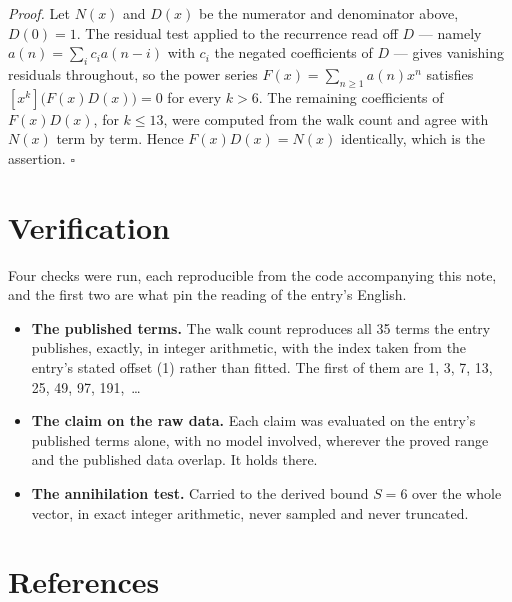 \documentclass[11pt]{article}
\theoremstyle{definition}
\begin{document}
{\itshape Proof.} Let $N(x)$ and $D(x)$ be the numerator and denominator above, $D(0)=1$. The residual test applied to the recurrence read off $D$ --- namely $a(n) = \sum_i c_i a(n-i)$ with $c_i$ the negated coefficients of $D$ --- gives vanishing residuals throughout, so the power series $F(x)=\sum_{n\ge 1}a(n)x^n$ satisfies $[x^k]\bigl(F(x)D(x)\bigr) = 0$ for every $k > 6$. The remaining coefficients of $F(x)D(x)$, for $k \le 13$, were computed from the walk count and agree with $N(x)$ term by term. Hence $F(x)D(x) = N(x)$ identically, which is the assertion. $\square$

\section{Verification}

Four checks were run, each reproducible from the code accompanying this note, and the first two are what pin the reading of the entry's English.

\begin{itemize}

\item {\bfseries The published terms.} The walk count reproduces all 35 terms the entry publishes, exactly, in integer arithmetic, with the index taken from the entry's stated offset (1) rather than fitted. The first of them are 1, 3, 7, 13, 25, 49, 97, 191,~\dots

\item {\bfseries The claim on the raw data.} Each claim was evaluated on the entry's published terms alone, with no model involved, wherever the proved range and the published data overlap. It holds there.

\item {\bfseries The annihilation test.} Carried to the derived bound $S = 6$ over the whole vector, in exact integer arithmetic, never sampled and never truncated.

\end{itemize}

\section{References}
\end{document}
